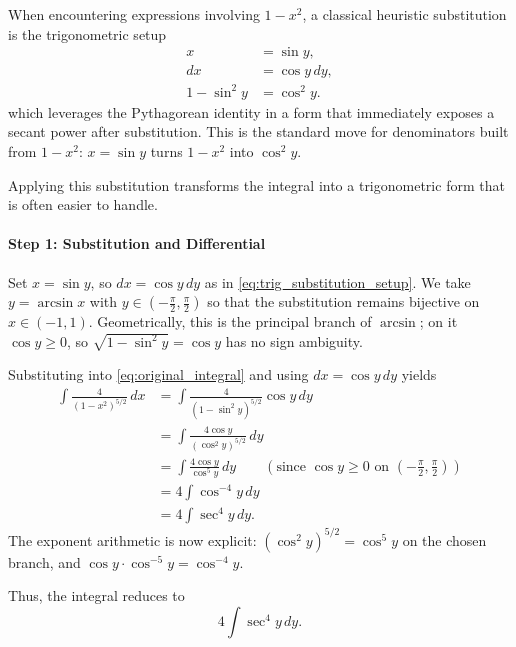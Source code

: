 When encountering expressions involving \(1 - x^2\), a classical heuristic substitution is the trigonometric setup
\begin{equation}
\begin{aligned}
x &= \sin y,\\
dx &= \cos y \, dy,\\
1 - \sin^2 y &= \cos^2 y.
\end{aligned}
\label{eq:trig_substitution_setup}
\end{equation}
which leverages the Pythagorean identity in a form that immediately exposes a secant power after substitution. This is the standard move for denominators built from \(1-x^2\): \(x=\sin y\) turns \(1-x^2\) into \(\cos^2 y\).

Applying this substitution transforms the integral into a trigonometric form that is often easier to handle.

\paragraph{Step 1: Substitution and Differential}

Set \(x = \sin y\), so \(dx = \cos y \, dy\) as in \eqref{eq:trig_substitution_setup}.
We take \(y = \arcsin x\) with \(y \in \left(-\frac{\pi}{2}, \frac{\pi}{2}\right)\) so that the substitution remains bijective on \(x \in (-1,1)\). Geometrically, this is the principal branch of \(\arcsin\); on it \(\cos y \ge 0\), so \(\sqrt{1-\sin^2 y}=\cos y\) has no sign ambiguity.

Substituting into \eqref{eq:original_integral} and using \(dx = \cos y \, dy\) yields
\begin{align*}
\int \frac{4}{(1 - x^2)^{5/2}} \, dx &= \int \frac{4}{(1 - \sin^2 y)^{5/2}} \cos y \, dy \\
&= \int \frac{4\cos y}{(\cos^2 y)^{5/2}} \, dy \\
&= \int \frac{4\cos y}{\cos^5 y} \, dy \qquad (\text{since }\cos y \ge 0 \text{ on }(-\tfrac{\pi}{2},\tfrac{\pi}{2})) \\
&= 4 \int \cos^{-4} y \, dy \\
&= 4 \int \sec^{4} y \, dy.
\end{align*}
The exponent arithmetic is now explicit: \((\cos^2 y)^{5/2}=\cos^5 y\) on the chosen branch, and \(\cos y \cdot \cos^{-5}y = \cos^{-4}y\).

Thus, the integral reduces to
\begin{equation}
  4 \int \sec^{4} y \, dy.
  \label{eq:sec4_integral}
\end{equation}

